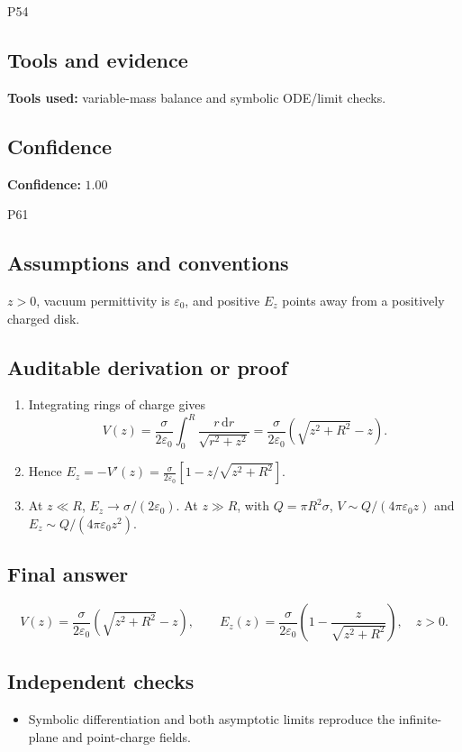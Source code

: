\documentclass[11pt]{article}
\newcommand{\dd}{\mathrm{d}}
\begin{document}
\begin{mprsolution}{P54}
\subsection*{Tools and evidence}
\textbf{Tools used:} variable-mass balance and symbolic ODE/limit checks.
\subsection*{Confidence}
\textbf{Confidence:} \(1.00\)
\end{mprsolution}

\begin{mprsolution}{P61}
\subsection*{Assumptions and conventions}
\(z>0\), vacuum permittivity is \(\varepsilon_0\), and positive \(E_z\) points
away from a positively charged disk.
\subsection*{Auditable derivation or proof}
\begin{enumerate}[label=\textbf{Step \arabic*:},leftmargin=*]
\item Integrating rings of charge gives
\[
V(z)=\frac{\sigma}{2\varepsilon_0}\int_0^R
\frac{r\,\dd r}{\sqrt{r^2+z^2}}
=\frac{\sigma}{2\varepsilon_0}(\sqrt{z^2+R^2}-z).
\]
\item Hence \(E_z=-V'(z)=\frac{\sigma}{2\varepsilon_0}
[1-z/\sqrt{z^2+R^2}]\).
\item At \(z\ll R\), \(E_z\to\sigma/(2\varepsilon_0)\).  At \(z\gg R\),
with \(Q=\pi R^2\sigma\),
\(V\sim Q/(4\pi\varepsilon_0z)\) and
\(E_z\sim Q/(4\pi\varepsilon_0z^2)\).
\end{enumerate}
\subsection*{Final answer}
\[
\boxed{\displaystyle
V(z)=\frac{\sigma}{2\varepsilon_0}(\sqrt{z^2+R^2}-z),\qquad
E_z(z)=\frac{\sigma}{2\varepsilon_0}
\left(1-\frac{z}{\sqrt{z^2+R^2}}\right),\quad z>0.}
\]
\subsection*{Independent checks}
\begin{itemize}[leftmargin=*]
\item Symbolic differentiation and both asymptotic limits reproduce the
infinite-plane and point-charge fields.
\end{itemize}

\end{mprsolution}
\end{document}
